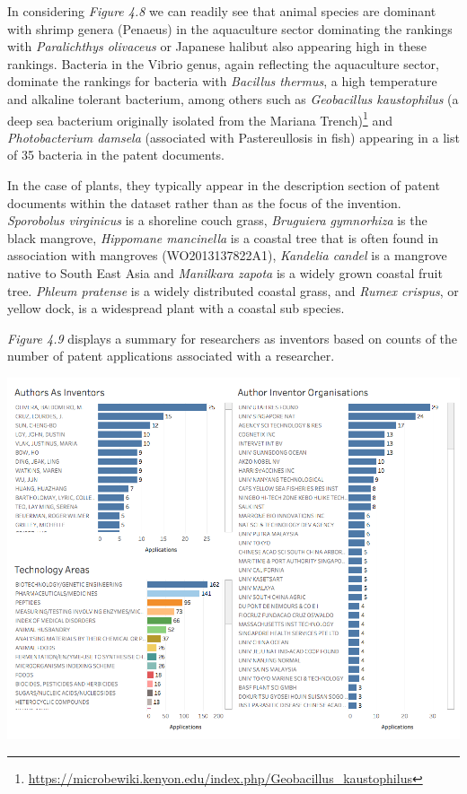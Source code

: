 \documentclass[]{book}
\theoremstyle{definition}
\theoremstyle{definition}
\theoremstyle{definition}
\theoremstyle{remark}
\begin{document}
In considering \emph{Figure 4.8} we can readily see that animal species
are dominant with shrimp genera (Penaeus) in the aquaculture sector
dominating the rankings with \emph{Paralichthys olivaceus} or Japanese
halibut also appearing high in these rankings. Bacteria in the Vibrio
genus, again reflecting the aquaculture sector, dominate the rankings
for bacteria with \emph{Bacillus thermus}, a high temperature and
alkaline tolerant bacterium, among others such as \emph{Geobacillus
kaustophilus} (a deep sea bacterium originally isolated from the Mariana
Trench)\footnote{\url{https://microbewiki.kenyon.edu/index.php/Geobacillus_kaustophilus}}
and \emph{Photobacterium damsela} (associated with Pastereullosis in
fish) appearing in a list of 35 bacteria in the patent documents.

In the case of plants, they typically appear in the description section
of patent documents within the dataset rather than as the focus of the
invention. \emph{Sporobolus virginicus} is a shoreline couch grass,
\emph{Bruguiera gymnorhiza} is the black mangrove, \emph{Hippomane
mancinella} is a coastal tree that is often found in association with
mangroves (WO2013137822A1), \emph{Kandelia candel} is a mangrove native
to South East Asia and \emph{Manilkara zapota} is a widely grown coastal
fruit tree. \emph{Phleum pratense} is a widely distributed coastal
grass, and \emph{Rumex crispus}, or yellow dock, is a widespread plant
with a coastal sub species.

\emph{Figure 4.9} displays a summary for researchers as inventors based
on counts of the number of patent applications associated with a
researcher.

\includegraphics[width=13.89in]{images-patents/author_inventor_dashboard}
\end{document}
